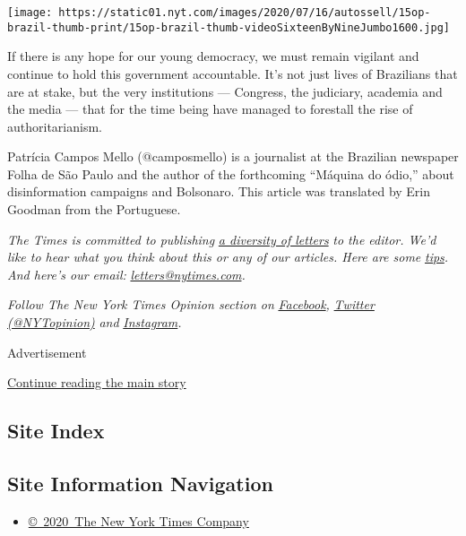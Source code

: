 \texttt{[image: https://static01.nyt.com/images/2020/07/16/autossell/15op-brazil-thumb-print/15op-brazil-thumb-videoSixteenByNineJumbo1600.jpg]}

If there is any hope for our young democracy, we must remain vigilant
and continue to hold this government accountable. It's not just lives of
Brazilians that are at stake, but the very institutions --- Congress,
the judiciary, academia and the media --- that for the time being have
managed to forestall the rise of authoritarianism.

Patrícia Campos Mello (@camposmello) is a journalist at the Brazilian
newspaper Folha de São Paulo and the author of the forthcoming ``Máquina
do ódio,'' about disinformation campaigns and Bolsonaro. This article
was translated by Erin Goodman from the Portuguese.

\emph{The Times is committed to publishing}
\href{https://www.nytimes.com/2019/01/31/opinion/letters/letters-to-editor-new-york-times-women.html}{\emph{a
diversity of letters}} \emph{to the editor. We'd like to hear what you
think about this or any of our articles. Here are some}
\href{https://help.nytimes.com/hc/en-us/articles/115014925288-How-to-submit-a-letter-to-the-editor}{\emph{tips}}\emph{.
And here's our email:}
\href{mailto:letters@nytimes.com}{\emph{letters@nytimes.com}}\emph{.}

\emph{Follow The New York Times Opinion section on}
\href{https://www.facebook.com/nytopinion}{\emph{Facebook}}\emph{,}
\href{http://twitter.com/NYTOpinion}{\emph{Twitter (@NYTopinion)}}
\emph{and}
\href{https://www.instagram.com/nytopinion/}{\emph{Instagram}}\emph{.}

Advertisement

\protect\hyperlink{after-bottom}{Continue reading the main story}

\hypertarget{site-index}{%
\subsection{Site Index}\label{site-index}}

\hypertarget{site-information-navigation}{%
\subsection{Site Information
Navigation}\label{site-information-navigation}}

\begin{itemize}
\tightlist
\item
  \href{https://help.nytimes.com/hc/en-us/articles/115014792127-Copyright-notice}{©~2020~The
  New York Times Company}
\end{itemize}

